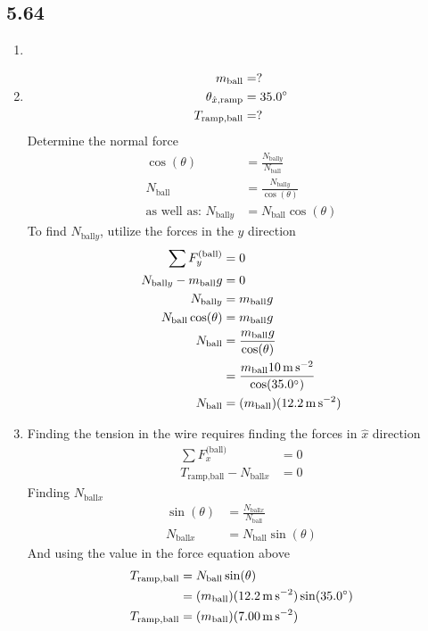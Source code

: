 \documentclass{article}
\begin{document}
\subsection{5.64}
\begin{enumerate}[label=\textbf{(\alph*)}]
	\item
	\item
		\begin{align*}
			m_\text{ball} & = ? \\
			\theta_{\hat{x},\text{ramp}} & = 35.0\degree \\
			T_{\text{ramp},\text{ball}} & = ?
		\end{align*}
		Determine the normal force
		\begin{align*}
			\cos(\theta) & = \frac{N_{\text{ball}y}}{N_\text{ball}} \\
			N_\text{ball} & = \frac{N_{\text{ball}y}}{\cos(\theta)} \\
			\text{as well as: } N_{\text{ball}y} & = N_\text{ball}\cos(\theta)
		\end{align*}
		To find $ N_{\text{ball}y} $, utilize the forces in the $ \hat{y} $ direction
		\begin{align*}
			\sum F_y^\text{(ball)} & = 0 \\
			N_{\text{ball}y} - m_\text{ball}g & = 0 \\
			N_{\text{ball}y} & = m_\text{ball}g \\
			N_\text{ball}\cos(\theta) & = m_\text{ball}g \\
			N_\text{ball} & = \frac{m_\text{ball}g}{\cos(\theta)} \\
						  & = \frac{m_\text{ball}\SI{10}{\meter \per \second \squared}}{\cos(35.0\degree)} \\
			N_\text{ball} & = (m_\text{ball})(\SI{12.2}{\meter \per \second \squared})
		\end{align*}
	\item
		Finding the tension in the wire requires finding the forces in $ \hat{x} $ direction
		\begin{align*}
			\sum F_x^\text{(ball)} & = 0 \\
			T_{\text{ramp},\text{ball}} - N_{\text{ball}x} & = 0
		\end{align*}
		Finding $ N_{\text{ball}x} $
		\begin{align*}
			\sin(\theta) & = \frac{N_{\text{ball}x}}{N_\text{ball}} \\
			N_{\text{ball}x} & = N_\text{ball}\sin(\theta)
		\end{align*}
		And using the value in the force equation above
		\begin{align*}
			T_{\text{ramp},\text{ball}} & = N_\text{ball}\sin(\theta) \\
										& = (m_\text{ball})(\SI{12.2}{\meter \per \second \squared})\sin(35.0\degree) \\
			T_{\text{ramp},\text{ball}} & = (m_\text{ball})(\SI{7.00}{\meter \per \second \squared})
		\end{align*}
\end{enumerate}
\end{document}
